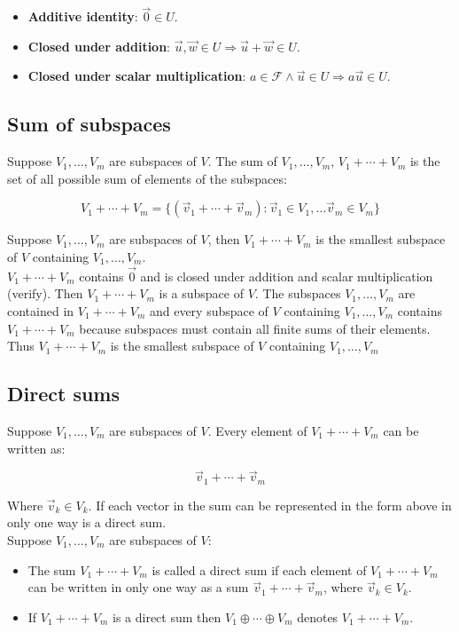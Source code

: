 \begin{multicols}{2}
  \begin{itemize}
    \item \textbf{Additive identity}: $\vec{0}\in U$.
    \item \textbf{Closed under addition}: $\vec{u},\vec{w}\in U\Rightarrow\vec{u}+\vec{w}\in U$.
    \item \textbf{Closed under scalar  multiplication}: $a\in\mathcal{F} \land \vec{u}\in U\Rightarrow a\vec{u}\in U$.
  \end{itemize}
\end{multicols}

  \subsection{Sum of subspaces}
  Suppose $V_1, \dots, V_m$ are subspaces of $V$.
  The sum of $V_1,\dots, V_m$, $V_1+\cdots+V_m$ is the set of all possible sum of elements of the subspaces:

  $$V_1+\cdots+V_m = \{ (\vec{v}_1+\cdots + \vec{v}_m) : \vec{v}_1\in V_1, \dots \vec{v}_m\in V_m\}$$

  Suppose $V_1,\dots, V_m$ are subspaces of $V$, then $V_1  + \cdots + V_m$ is the smallest subspace of $V$ containing $V_1, \dots, V_m$.\\
  $V_1+\cdots +V_m$ contains $\vec{0}$ and is closed under addition and scalar multiplication (verify).
  Then $V_1+\cdots+ V_m$ is a subspace of $V$.
  The subspaces $V_1, \dots, V_m$ are contained in $V_1+\cdots+V_m$ and every subspace of $V$ containing $V_1,\dots,V_m$ contains $V_1+\cdots+V_m$ because subspaces must contain all finite sums of their elements.
  Thus $V_1+\cdots+V_m$ is the smallest subspace of $V$ containing $V_1,\dots,V_m$

  \subsection{Direct sums}
  Suppose $V_1, \dots, V_m$ are subspaces of $V$.
  Every element of $V_1+\cdots + V_m$ can be written as:

  $$\vec{v}_1+\cdots+\vec{v}_m$$

  Where $\vec{v}_k\in V_k$.
  If each vector in the sum can be represented in the form above in only one way is a direct sum.\\
  Suppose $V_1, \dots, V_m$ are subspaces of $V$:

  \begin{multicols}{2}
    \begin{itemize}
      \item The sum $V_1+\cdots +V_m$ is called a direct sum if each element of $V_1+\cdots +V_m$ can be written in only one way as a sum $\vec{v}_1+\cdots+\vec{v}_m$, where $\vec{v}_k\in V_k$.
      \item If $V_1+\cdots +V_m$ is a direct sum then $V_1\oplus\cdots\oplus V_m$ denotes $V_1+\cdots +V_m$.
    \end{itemize}
  \end{multicols}

